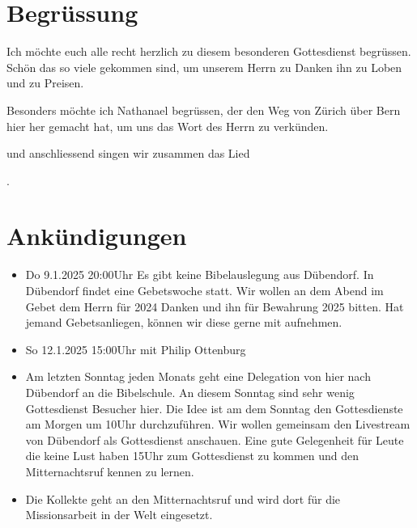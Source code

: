 
\section{Begrüssung}

Ich möchte euch alle recht herzlich zu diesem besonderen Gottesdienst begrüssen. Schön das so viele gekommen sind, um unserem Herrn zu Danken ihn zu Loben und zu Preisen.

Besonders möchte ich Nathanael begrüssen, der den Weg von Zürich über Bern hier her gemacht hat, um uns das Wort des Herrn zu verkünden. 

\noindent
\beten{} und anschliessend singen wir zusammen das Lied

\noindent
{}.

\section{Ankündigungen}
\begin{itemize}
    \item {} Do 9.1.2025 20:00Uhr Es gibt keine Bibelauslegung aus Dübendorf. In Dübendorf findet eine Gebetswoche statt. Wir wollen an dem Abend im Gebet dem Herrn für 2024 Danken und ihn für Bewahrung 2025 bitten. Hat jemand Gebetsanliegen, können wir diese gerne mit aufnehmen.
    \item {} So 12.1.2025 15:00Uhr mit Philip Ottenburg
    \item {} Am letzten Sonntag jeden Monats geht eine Delegation von hier nach Dübendorf an die Bibelschule. An diesem Sonntag sind sehr wenig Gottesdienst Besucher hier. Die Idee ist am dem Sonntag den Gottesdienste am Morgen um 10Uhr durchzuführen. Wir wollen gemeinsam den Livestream von Dübendorf als Gottesdienst anschauen. Eine gute Gelegenheit für Leute die keine Lust haben 15Uhr zum Gottesdienst zu kommen und den Mitternachtsruf kennen zu lernen.
    \item {} Die Kollekte geht an den Mitternachtsruf und wird dort für die Missionsarbeit in der Welt eingesetzt.
\end{itemize}

